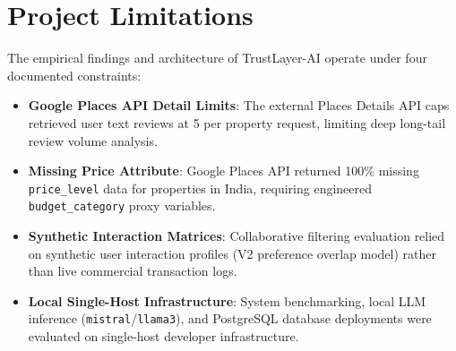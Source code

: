 \section{Project Limitations}
The empirical findings and architecture of TrustLayer-AI operate under four documented constraints:
\begin{itemize}
    \item \textbf{Google Places API Detail Limits}: The external Places Details API caps retrieved user text reviews at 5 per property request, limiting deep long-tail review volume analysis.
    \item \textbf{Missing Price Attribute}: Google Places API returned 100\% missing \texttt{price\_level} data for properties in India, requiring engineered \texttt{budget\_category} proxy variables.
    \item \textbf{Synthetic Interaction Matrices}: Collaborative filtering evaluation relied on synthetic user interaction profiles (V2 preference overlap model) rather than live commercial transaction logs.
    \item \textbf{Local Single-Host Infrastructure}: System benchmarking, local LLM inference (\texttt{mistral}/\texttt{llama3}), and PostgreSQL database deployments were evaluated on single-host developer infrastructure.
\end{itemize}

